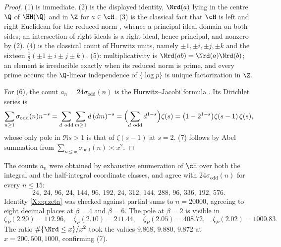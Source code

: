 \begin{proof}
(1) is immediate. (2) is the displayed identity, $\Nrd(a)$ lying in the centre $\Q$ of
$\HH(\Q)$ and in $\Z$ for $a\in\cH$. (3) is the classical fact that $\cH$ is left and right
Euclidean for the reduced norm \cite{Hurwitz}, whence a principal ideal domain on both
sides; an intersection of right ideals is a right ideal, hence principal, and nonzero by (2). (4) is the classical
count of Hurwitz units, namely $\pm1,\pm i,\pm j,\pm k$ and the sixteen
$\tfrac12(\pm1\pm i\pm j\pm k)$. (5): multiplicativity is $\Nrd(ab)=\Nrd(a)\Nrd(b)$; an
element is irreducible exactly when its reduced norm is prime, and every prime occurs; the
$\Q$-linear independence of $\{\log p\}$ is unique factorization in $\Z$.

For (6), the count $a_n=24\sigma_{\mathrm{odd}}(n)$ is the Hurwitz--Jacobi formula
\cite{Hurwitz}. Its
Dirichlet series is
\[
\sum_{n\ge1}\sigma_{\mathrm{odd}}(n)n^{-s}
=\sum_{d\ \mathrm{odd}}\sum_{m\ge1}d\,(dm)^{-s}
=\Bigl(\sum_{d\ \mathrm{odd}}d^{1-s}\Bigr)\zeta(s)
=\bigl(1-2^{1-s}\bigr)\zeta(s-1)\,\zeta(s),
\]
whose only pole in $\Re s>1$ is that of $\zeta(s-1)$ at $s=2$. (7) follows by Abel summation
from $\sum_{n\le x}\sigma_{\mathrm{odd}}(n)\asymp x^2$.
\end{proof}

\begin{remark}\label{X:rem:num}
The counts $a_n$ were obtained by exhaustive enumeration of $\cH$ over both the integral and
the half-integral coordinate classes, and agree with $24\sigma_{\mathrm{odd}}(n)$ for every
$n\le15$:
\[
24,\,24,\,96,\,24,\,144,\,96,\,192,\,24,\,312,\,144,\,288,\,96,\,336,\,192,\,576 .
\]
Identity \eqref{X:eq:zeta} was checked against partial sums to $n=20000$, agreeing to eight
decimal places at $\beta=4$ and $\beta=6$. The pole at $\beta=2$ is visible in
\[
\zeta_P(2.20)=112.96,\quad \zeta_P(2.10)=211.44,\quad \zeta_P(2.05)=408.72,\quad \zeta_P(2.02)=1000.83 .
\]
The ratio $\#\{\Nrd\le x\}/x^2$ took the values $9.868$, $9.880$, $9.872$ at
$x=200,500,1000$, confirming (7).
\end{remark}

